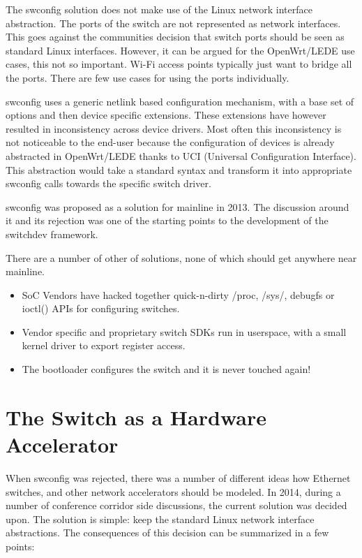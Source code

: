 \documentclass[letterpaper]{article}
\begin{document}
The swconfig solution does not make use of the Linux network interface
abstraction. The ports of the switch are not represented as network
interfaces. This goes against the communities decision that switch
ports should be seen as standard Linux interfaces. However, it can be
argued for the OpenWrt/LEDE use cases, this not so important. Wi-Fi
access points typically just want to bridge all the ports. There are
few use cases for using the ports individually.

swconfig uses a generic netlink based configuration mechanism, with a
base set of options and then device specific extensions. These
extensions have however resulted in inconsistency across device
drivers. Most often this inconsistency is not noticeable to the
end-user because the configuration of devices is already abstracted in
OpenWrt/LEDE thanks to UCI (Universal Configuration Interface). This
abstraction would take a standard syntax and transform it into
appropriate swconfig calls towards the specific switch driver.

swconfig \cite{swconfig} was proposed as a solution for mainline in 2013. The
discussion around it and its rejection was one of the starting points
to the development of the switchdev framework.

There are a number of other of solutions, none of which should get
anywhere near mainline.

\begin{itemize}
\item SoC Vendors have hacked together quick-n-dirty /proc, /sys/,
  debugfs or ioctl() APIs for configuring switches.
\item Vendor specific and proprietary switch SDKs run in userspace,
  with a small kernel driver to export register access.
\item The bootloader configures the switch and it is never touched again!
\end{itemize}

\section{The Switch as a Hardware Accelerator}

When swconfig was rejected, there was a number of different ideas how
Ethernet switches, and other network accelerators should be modeled.
In 2014, during a number of conference corridor side discussions, the
current solution was decided upon. The solution is simple: keep the
standard Linux network interface abstractions. The consequences of
this decision can be summarized in a few points:
\end{document}
